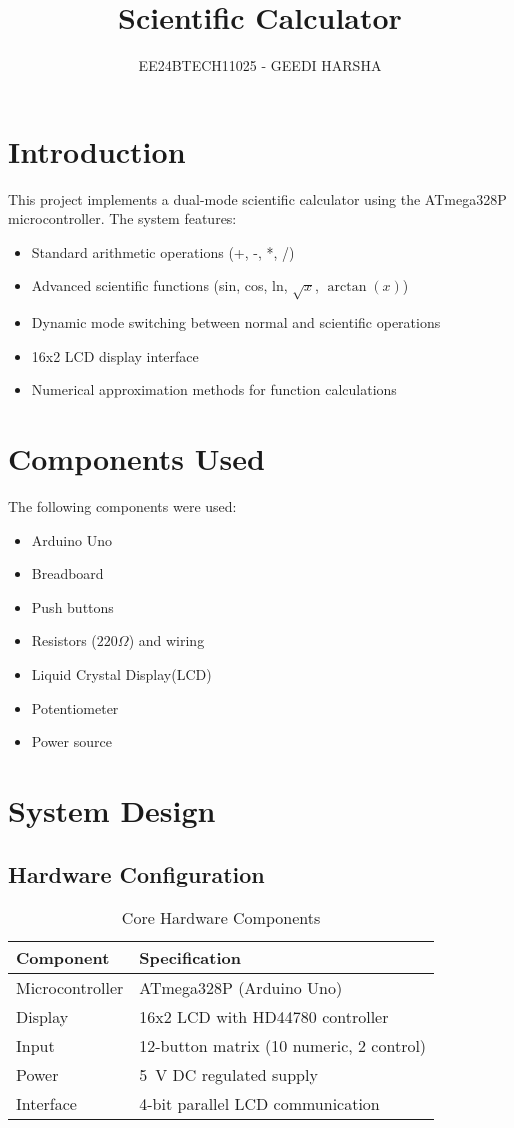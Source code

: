\documentclass[journal]{IEEEtran}
\begin{document}
\title{Scientific Calculator}
\author{EE24BTECH11025 - GEEDI HARSHA}

\maketitle

\section{Introduction}
This project implements a dual-mode scientific calculator using the ATmega328P microcontroller. The system features:
\begin{itemize}
    \item Standard arithmetic operations (+, -, *, /)
    \item Advanced scientific functions (sin, cos, ln, $\sqrt{x}$, $\arctan(x)$)
    \item Dynamic mode switching between normal and scientific operations
    \item 16x2 LCD display interface
    \item Numerical approximation methods for function calculations
\end{itemize}

\section{Components Used}
The following components were used:
\begin{itemize}
    \item Arduino Uno
    \item Breadboard
    \item Push buttons 
    \item Resistors ($220\Omega$) and wiring
    \item Liquid Crystal Display(LCD)
    \item Potentiometer
    \item Power source
\end{itemize}
\section{System Design}
\subsection{Hardware Configuration}
\begin{table}[h!]
\centering
\caption{Core Hardware Components}
\begin{tabular}{|l|l|}
\hline
\textbf{Component} & \textbf{Specification} \\
\hline
Microcontroller & ATmega328P (Arduino Uno) \\
Display & 16x2 LCD with HD44780 controller \\
Input & 12-button matrix (10 numeric, 2 control) \\
Power & \SI{5}{V} DC regulated supply \\
Interface & 4-bit parallel LCD communication \\
\hline
\end{tabular}
\end{table}
\end{document}
